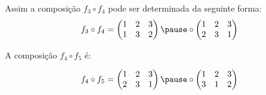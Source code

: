 \documentclass{beamer}
\begin{document}
    \begin{frame}
        Assim a composi\c{c}\~ao $f_3 \circ f_4$ pode ser determinada da seguinte forma:
        \[
            f_3\circ f_4 = \begin{pmatrix}
                    1 & 2 & 3\\
                    1 & 3 & 2
                \end{pmatrix} \pause \circ \begin{pmatrix}
                    1 & 2 & 3\\
                    2 & 3 & 1
                \end{pmatrix}
        \]
    \end{frame}

    \begin{frame}
        A composi\c{c}\~ao $f_4 \circ f_5$ \'e:

        \[
            f_4\circ f_5 = \begin{pmatrix}
                    1 & 2 & 3\\
                    2 & 3 & 1
                \end{pmatrix} \pause \circ \begin{pmatrix}
                    1 & 2 & 3\\
                    3 & 1 & 2
                \end{pmatrix}
        \]
    \end{frame}
\end{document}
